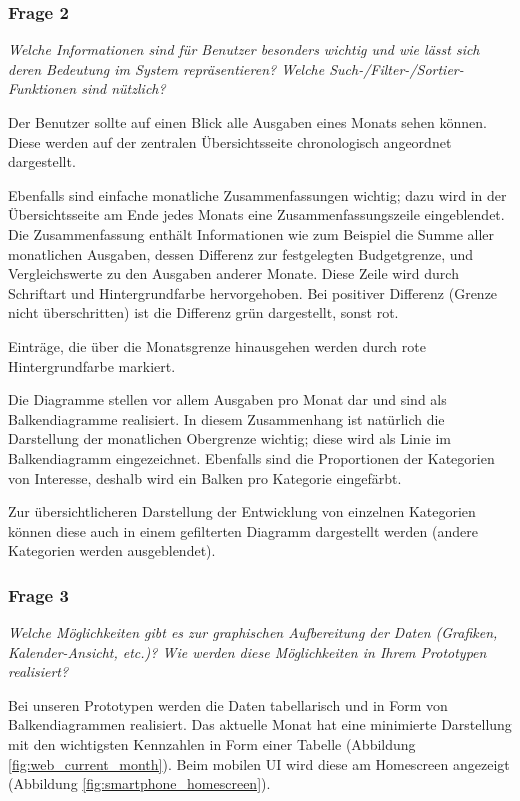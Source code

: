 \subsubsection{Frage 2}

\emph{Welche Informationen sind für Benutzer besonders wichtig und wie lässt sich
deren Bedeutung im System repräsentieren? Welche Such-/Filter-/Sortier-Funktio\-nen sind nützlich?}

\vspace{2mm}

Der Benutzer sollte auf einen Blick alle Ausgaben eines Monats sehen k\"onnen. Diese
werden auf der zentralen \"Ubersichtsseite chronologisch angeordnet dargestellt.

Ebenfalls sind einfache monatliche Zusammenfassungen wichtig; dazu wird in der
\"Ubersichtsseite am Ende jedes Monats eine Zusammenfassungszeile eingeblendet.
Die Zusammenfassung enth\"alt Informationen wie zum Beispiel die Summe aller monatlichen
Ausgaben, dessen Differenz zur festgelegten Budgetgrenze, und Vergleichswerte zu den Ausgaben
anderer Monate. Diese Zeile wird durch Schriftart und Hintergrundfarbe hervorgehoben.
Bei positiver Differenz (Grenze nicht \"uberschritten) ist die Differenz gr\"un dargestellt,
sonst rot.

Eintr\"age, die \"uber die Monatsgrenze hinausgehen werden durch rote Hintergrundfarbe
markiert.

Die Diagramme stellen vor allem Ausgaben pro Monat dar und sind als Balkendiagramme realisiert.
In diesem Zusammenhang ist nat\"urlich die Darstellung der monatlichen Obergrenze wichtig;
diese wird als Linie im Balkendiagramm eingezeichnet. Ebenfalls sind die Proportionen der Kategorien
von Interesse, deshalb wird ein Balken pro Kategorie eingef\"arbt.

Zur \"ubersichtlicheren Darstellung der Entwicklung von einzelnen Kategorien k\"onnen
diese auch in einem gefilterten Diagramm dargestellt werden (andere Kategorien werden
ausgeblendet).



\subsubsection{Frage 3}

\emph{Welche Möglichkeiten gibt es zur graphischen Aufbereitung der Daten 
(Grafiken, Kalender-Ansicht, etc.)? Wie werden diese Möglichkeiten in Ihrem Prototypen realisiert?}

\vspace{2mm}
Bei unseren Prototypen werden die Daten tabellarisch und in Form von Balkendiagrammen realisiert.
Das aktuelle Monat hat eine minimierte Darstellung mit den wichtigsten Kennzahlen in Form einer 
Tabelle (Abbildung \ref{fig:web_current_month}). Beim mobilen UI wird diese am Homescreen angezeigt
(Abbildung \ref{fig:smartphone_homescreen}).

